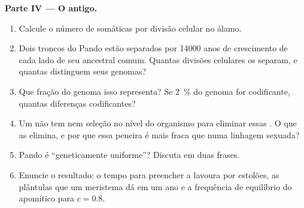 \begin{problem}
\medskip
\noindent\textbf{Parte IV --- O  antigo.}
\begin{enumerate}[resume]
  \item Calcule o número de  somáticas por divisão celular no
        álamo.
  \item Dois troncos do  Pando estão separados por \num{14000}
        anos de crescimento de cada lado de seu ancestral comum. Quantas
        divisões celulares os separam, e quantas  distinguem
        seus genomas?
  \item Que fração do genoma isso representa? Se \qty{2}{\%} do
        genoma for codificante, quantas diferenças codificantes?
  \item Um  não tem  nem seleção no nível do organismo para
        eliminar essas . O que as elimina, e por que essa
        peneira é mais fraca que numa linhagem sexuada?
  \item Pando é ``geneticamente uniforme''? Discuta em duas frases.
  \item Enuncie o resultado: o tempo para preencher a lavoura por
        estolões, as plântulas que um meristema dá em um ano e a
        frequência de equilíbrio do apomítico para $c = 0.8$.
\end{enumerate}
\end{problem}
